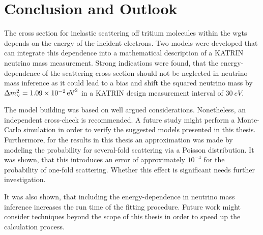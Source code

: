 \section{Conclusion and Outlook}
\label{sec:eDepScatCrossSecConclusion}
The cross section for inelastic scattering off tritium molecules within the \gls{wgts} depends on the energy of the incident electrons. Two models were developed that can integrate this dependence into a mathematical description of a KATRIN neutrino mass measurement. Strong indications were found, that the energy-dependence of the scattering cross-section should not be neglected in neutrino mass inference as it could lead to a bias and shift the squared neutrino mass by $\Delta m_\upnu^2 = \SI{1.09e-2}{eV^2}$ in a KATRIN design measurement interval of $\SI{30}{eV}$.

The model building was based on well argued considerations. Nonetheless, an independent cross-check is recommended. A future study might perform a Monte-Carlo simulation in order to verify the suggested models presented in this thesis. Furthermore, for the results in this thesis an approximation was made by modeling the probability for several-fold scattering via a Poisson distribution. It was shown, that this introduces an error of approximately $10^{-4}$ for the probability of one-fold scattering. Whether this effect is significant needs further investigation.

It was also shown, that including the energy-dependence in neutrino mass inference increases the run time of the fitting procedure. Future work might consider techniques beyond the scope of this thesis in order to speed up the calculation process.